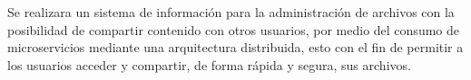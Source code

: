 Se realizara un sistema de información para la administración de archivos
con la posibilidad de compartir contenido con otros usuarios,
por medio del consumo de microservicios mediante una arquitectura distribuida,
esto con el fin de permitir a los usuarios acceder y compartir, de forma rápida
y segura, sus archivos.